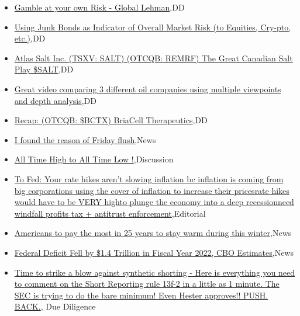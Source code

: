 \documentclass{article}%
\begin{document}
%
\begin{itemize}%
\item%
\href{https://reddit.com/r/wallstreetbets/comments/y4mzgx/gamble\_at\_your\_own\_risk\_global\_lehman/}{Gamble at your own Risk - Global Lehman},DD%
\item%
\href{https://reddit.com/r/wallstreetbets/comments/y4mhxl/using\_junk\_bonds\_as\_indicator\_of\_overall\_market/}{Using Junk Bonds as Indicator of Overall Market Risk (to Equities, Cry-pto, etc.)},DD%
\item%
\href{https://reddit.com/r/Baystreetbets/comments/y41jc7/atlas\_salt\_inc\_tsxv\_salt\_otcqb\_remrf\_the\_great/}{Atlas Salt Inc. (TSXV: SALT) (OTCQB: REMRF) The Great Canadian Salt Play \$SALT},DD%
\item%
\href{https://reddit.com/r/Baystreetbets/comments/y410rz/great\_video\_comparing\_3\_different\_oil\_companies/}{Great video comparing 3 different oil companies using multiple viewpoints and depth analysis},DD%
\item%
\href{https://reddit.com/r/Baystreetbets/comments/y3ztxl/recap\_otcqb\_bctx\_briacell\_therapeutics/}{Recap: (OTCQB: \$BCTX) BriaCell Therapeutics},DD%
\item%
\href{https://reddit.com/r/StockMarket/comments/y4j9vt/i\_found\_the\_reason\_of\_friday\_flush/}{I found the reason of Friday flush},News%
\item%
\href{https://reddit.com/r/StockMarket/comments/y4fmbq/all\_time\_high\_to\_all\_time\_low/}{All Time High to All Time Low !},Discussion%
\item%
\href{https://reddit.com/r/Economics/comments/y4kaw5/to\_fed\_your\_rate\_hikes\_arent\_slowing\_inflation\_bc/}{To Fed: Your rate hikes aren't slowing inflation bc inflation is coming from big corporations using the cover of inflation to increase their prices\ldotsYour rate hikes would have to be VERY high\ldotsenough to plunge the economy into a deep recession\ldotsWe need windfall profits tax + antitrust enforcement},Editorial%
\item%
\href{https://reddit.com/r/Economics/comments/y4hbye/americans\_to\_pay\_the\_most\_in\_25\_years\_to\_stay/}{Americans to pay the most in 25 years to stay warm during this winter},News%
\item%
\href{https://reddit.com/r/Economics/comments/y4fz8r/federal\_deficit\_fell\_by\_14\_trillion\_in\_fiscal/}{Federal Deficit Fell by \$1.4 Trillion in Fiscal Year 2022, CBO Estimates},News%
\item%
\href{https://reddit.com/r/Superstonk/comments/y4m63e/time\_to\_strike\_a\_blow\_against\_synthetic\_shorting/}{ Time to strike a blow against synthetic shorting - Here is everything you need to comment on the Short Reporting rule 13f-2 in a little as 1 minute. The SEC is trying to do the bare minimum! Even Hester approves!! PUSH. BACK.}, Due Diligence%
\end{itemize}%
\end{document}
